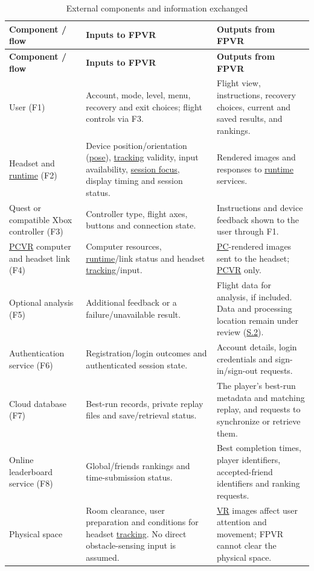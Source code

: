 \documentclass[12pt]{article}
\begin{document}
\begingroup\small\renewcommand{\arraystretch}{1.15}
\begin{longtable}{@{}>{\raggedright\arraybackslash}p{}
                         >{\raggedright\arraybackslash}p{}
                         >{\raggedright\arraybackslash}p{}@{}}
\caption{External components and information exchanged}
\label{tab:e-external}\\
\toprule\textbf{Component / flow} & \textbf{Inputs to FPVR} &
\textbf{Outputs from FPVR}\\\midrule\endfirsthead
\toprule\textbf{Component / flow} & \textbf{Inputs to FPVR} &
\textbf{Outputs from FPVR}\\\midrule\endhead
\bottomrule\endfoot
User (F1) & Account, mode, level, menu, recovery and exit choices; flight controls via F3. &
Flight view, instructions, recovery choices, current and saved results, and rankings. \\
Headset and \hyperlink{glos:Runtime}{runtime} (F2) & \hypertarget{gl:Tracking}{}Device position/orientation (\hyperlink{glos:Tracking}{pose}), \hyperlink{glos:Tracking}{tracking} validity,
input availability, \hypertarget{gl:Focus}{}\hyperlink{glos:Focus}{session focus}, display timing and session status. &
Rendered images and responses to \hyperlink{glos:Runtime}{runtime} services. \\
Quest or compatible Xbox controller (F3) & Controller type, flight axes,
buttons and connection state. & Instructions and device feedback shown to the
user through F1. \\
\hyperlink{glos:PCVR}{PCVR} computer and headset link (F4) & Computer resources, \hyperlink{glos:Runtime}{runtime}/link status
and headset \hyperlink{glos:Tracking}{tracking}/input. & \hyperlink{glos:PCVR}{PC}-rendered images sent to the headset; \hyperlink{glos:PCVR}{PCVR} only. \\
Optional analysis (F5) & Additional feedback or a failure/unavailable result. &
Flight data for analysis, if included. Data and processing location remain
under review (\hyperref[sec:s2-ai]{S.2}). \\
Authentication service (F6) & Registration/login outcomes and authenticated
session state. & Account details, login credentials and sign-in/sign-out requests. \\
Cloud database (F7) & Best-run records, private replay files and save/retrieval status. &
The player's best-run metadata and matching replay, and requests to synchronize or retrieve them. \\
Online leaderboard service (F8) & Global/friends rankings and time-submission status. &
Best completion times, player identifiers, accepted-friend identifiers and ranking requests. \\
Physical space & Room clearance, user preparation and conditions for headset
\hyperlink{glos:Tracking}{tracking}. No direct obstacle-sensing input is assumed. & \hyperlink{glos:VR}{VR} images affect user
attention and movement; FPVR cannot clear the physical space. \\
\end{longtable}\endgroup
\end{document}
